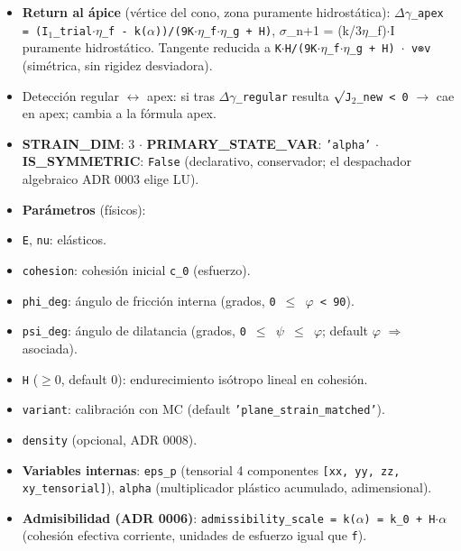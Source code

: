 \documentclass[11pt,letterpaper,oneside]{report}
\begin{document}
\begin{itemize}
  \item \textbf{Return al ápice} (vértice del cono, zona puramente hidrostática): \texttt{\ensuremath{\Delta}\ensuremath{\gamma}\_apex = (I\ensuremath{_{1}}\_trial\ensuremath{\cdot}\ensuremath{\eta}\_f - k(\ensuremath{\alpha}))/(9K\ensuremath{\cdot}\ensuremath{\eta}\_f\ensuremath{\cdot}\ensuremath{\eta}\_g + H)}, \ensuremath{\sigma}\_n+1 = (k/3\ensuremath{\eta}\_f)\ensuremath{\cdot}I puramente hidrostático. Tangente reducida a \texttt{K\ensuremath{\cdot}H/(9K\ensuremath{\cdot}\ensuremath{\eta}\_f\ensuremath{\cdot}\ensuremath{\eta}\_g + H) \ensuremath{\cdot} v⊗v} (simétrica, sin rigidez desviadora).
  \item Detección regular \ensuremath{\leftrightarrow} apex: si tras \texttt{\ensuremath{\Delta}\ensuremath{\gamma}\_regular} resulta \texttt{\ensuremath{\surd}J\ensuremath{_{2}}\_new < 0} \ensuremath{\to} cae en apex; cambia a la fórmula apex.
  \item \textbf{STRAIN\_DIM}: 3 \ensuremath{\cdot} \textbf{PRIMARY\_STATE\_VAR}: \texttt{'alpha'} \ensuremath{\cdot} \textbf{IS\_SYMMETRIC}: \texttt{False} (declarativo, conservador; el despachador algebraico ADR 0003 elige LU).
  \item \textbf{Parámetros} (físicos):
  \item \texttt{E}, \texttt{nu}: elásticos.
  \item \texttt{cohesion}: cohesión inicial \texttt{c\_0} (esfuerzo).
  \item \texttt{phi\_deg}: ángulo de fricción interna (grados, \texttt{0 \ensuremath{\le} \ensuremath{\varphi} < 90}).
  \item \texttt{psi\_deg}: ángulo de dilatancia (grados, \texttt{0 \ensuremath{\le} \ensuremath{\psi} \ensuremath{\le} \ensuremath{\varphi}}; default \texttt{\ensuremath{\varphi}} \ensuremath{\Rightarrow} asociada).
  \item \texttt{H} (\ensuremath{\ge}0, default 0): endurecimiento isótropo lineal en cohesión.
  \item \texttt{variant}: calibración con MC (default \texttt{'plane\_strain\_matched'}).
  \item \texttt{density} (opcional, ADR 0008).
  \item \textbf{Variables internas}: \texttt{eps\_p} (tensorial 4 componentes \texttt{[xx, yy, zz, xy\_tensorial]}), \texttt{alpha} (multiplicador plástico acumulado, adimensional).
  \item \textbf{Admisibilidad (ADR 0006)}: \texttt{admissibility\_scale = k(\ensuremath{\alpha}) = k\_0 + H\ensuremath{\cdot}\ensuremath{\alpha}} (cohesión efectiva corriente, unidades de esfuerzo igual que \texttt{f}).

\end{itemize}
\end{document}
